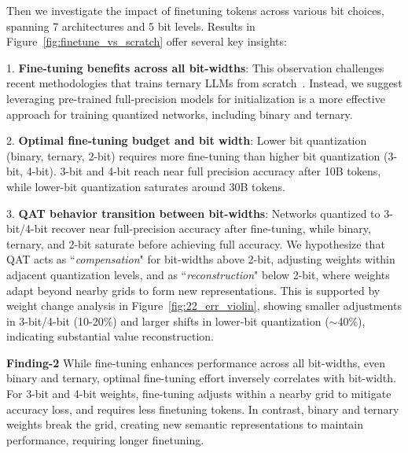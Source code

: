 Then we investigate the impact of finetuning tokens across various bit choices, spanning 7 architectures and 5 bit levels. Results in Figure~\ref{fig:finetune_vs_scratch} offer several key insights:

1. \textbf{Fine-tuning benefits across all bit-widths}: This observation challenges recent methodologies that trains ternary LLMs from scratch~\cite{kaushal2024spectra, ma2024era}. Instead, we suggest leveraging pre-trained full-precision models for initialization is a more effective approach for training quantized networks, including binary and ternary.

2. \textbf{Optimal fine-tuning budget and bit width}: Lower bit quantization (binary, ternary, 2-bit) requires more fine-tuning than higher bit quantization (3-bit, 4-bit). 3-bit and 4-bit reach near full precision accuracy after 10B tokens, while lower-bit quantization saturates around 30B tokens.



3. \textbf{QAT behavior transition between bit-widths}: Networks quantized to 3-bit/4-bit recover near full-precision accuracy after fine-tuning, while binary, ternary, and 2-bit saturate before achieving full accuracy. We hypothesize that QAT acts as ``\textit{compensation}" for bit-widths above 2-bit, adjusting weights within adjacent quantization levels, and as ``\textit{reconstruction}" below 2-bit, where weights adapt beyond nearby grids to form new representations. This is supported by weight change analysis in Figure~\ref{fig:22_err_violin}, showing smaller adjustments in 3-bit/4-bit (10-20\%) and larger shifts in lower-bit quantization ($\sim$40\%), indicating substantial value reconstruction.

\begin{tcolorbox}[
  enhanced,
  colback=blue!4!white,
  boxrule=0.8 pt, 
  boxsep=0pt, 
  left=2pt, 
right=2pt, 
  top=2pt, 
  bottom=2pt, 
  drop fuzzy shadow=black!50
]
\textbf{Finding-2} 
While fine-tuning enhances performance across all bit-widths, even binary and ternary, optimal fine-tuning effort inversely correlates with bit-width. For 3-bit and 4-bit weights, fine-tuning adjusts within a nearby grid to mitigate accuracy loss, and requires less finetuning tokens. In contrast, binary and ternary weights break the grid, creating new semantic representations to maintain performance, requiring longer finetuning.
\end{tcolorbox}
